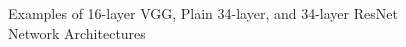 \documentclass{article}
\begin{document}
\begin{figure}
\begin{center}
\end{center}
	\caption{Examples of 16-layer VGG, Plain 34-layer, and 34-layer ResNet Network 
	Architectures}
\end{figure}
\end{document}
